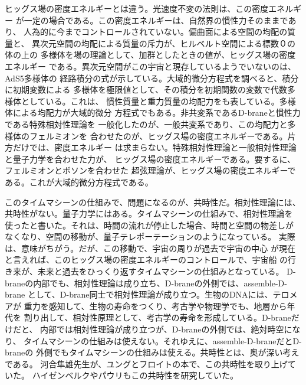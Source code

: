\documentclass{jsarticle}
\begin{document}
ヒッグス場の密度エネルギーとは違う。光速度不変の法則は、この密度エネルギー
が一定の場合である。この密度エネルギーは、自然界の慣性力そのままであり、
人為的に今までコントロールされていない。偏曲面による空間の均配の質量と、
異次元空間の均配による質量の斥力が、ヒルベルト空間による標数０の体の上の
多様体を場の理論として、加群としたときの値が、ヒッグス場の密度エネルギー
である。異次元空間がこの宇宙と現存しているようでいないのは、AdS5多様体の
経路積分の式が示している。大域的微分方程式を調べると、積分に初期変数による
多様体を極限値として、その積分を初期関数の変数で代数多様体としている。これは、
慣性質量と重力質量の均配力をも表している。多様体による均配力が大域的微分
方程式でもある。非共変系であるD-braneと慣性力である特殊相対性理論を
一般化したのが、一般共変系であり、この均配力と多様体のフェルミオンを
合わせたのが、ヒッグス場の密度エネルギーである。片方だけでは、密度エネルギー
は求まらない。特殊相対性理論と一般相対性理論と量子力学を合わせた力が、
ヒッグス場の密度エネルギーである。要するに、フェルミオンとボソンを合わせた
超弦理論が、ヒッグス場の密度エネルギーである。これが大域的微分方程式である。

このタイムマシーンの仕組みで、問題になるのが、共時性だ。相対性理論には、
共時性がない。量子力学にはある。タイムマシーンの仕組みで、相対性理論を
使ったと書いた。それは、時間の流れが停止した場合、時間と空間の物差しが
なくなり、空間の移動が、量子テレポーテーションのようになっている。
実際は、意味がちがう。だが、この移動で、宇宙の周りが過去で宇宙の中心
が現在と言えれば、このヒッグス場の密度エネルギーのコントロールで、宇宙船
の行き来が、未来と過去をひっくり返すタイムマシーンの仕組みとなっている。
D-braneの内部でも、相対性理論は成り立ち、D-braneの外側では、assemble-D-brane
として、D-brane同士で相対性理論が成り立つ。生物のDNAには、テロメアが
重力を感知して、生物の寿命をつくり、考古学や物理学でも、地層から年代を
割り出して、相対性原理として、考古学の寿命を形成している。D-braneだけだと、
内部では相対性理論が成り立つが、D-braneの外側では、絶対時空になり、
タイムマシーンの仕組みは使えない。それゆえに、assemble-D-braneだとD-braneの
外側でもタイムマシーンの仕組みは使える。共時性とは、奥が深い考えである。
河合隼雄先生が、ユングとフロイトの本で、この共時性を取り上げていた。
ハイゼンベルクやパウリもこの共時性を研究していた。
\end{document}
